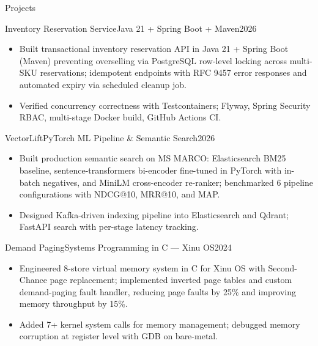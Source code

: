\documentclass[]{mcdowellcv}
\begin{document}
\begin{cvsection}{Projects}
  \begin{cvsubsection}{Inventory Reservation Service}{Java 21 + Spring Boot + Maven}{2026}
    \begin{itemize}
      \item Built transactional inventory reservation API in Java 21 + Spring Boot (Maven) preventing overselling via PostgreSQL row-level locking across multi-SKU reservations; idempotent endpoints with RFC 9457 error responses and automated expiry via scheduled cleanup job.
      \item Verified concurrency correctness with Testcontainers; Flyway, Spring Security RBAC, multi-stage Docker build, GitHub Actions CI.
    \end{itemize}
    \vspace{-1.5pt}
  \end{cvsubsection}

  \begin{cvsubsection}{VectorLift}{PyTorch ML Pipeline \& Semantic Search}{2026}
    \begin{itemize}
      \item Built production semantic search on MS MARCO: Elasticsearch BM25 baseline, sentence-transformers bi-encoder fine-tuned in PyTorch with in-batch negatives, and MiniLM cross-encoder re-ranker; benchmarked 6 pipeline configurations with NDCG@10, MRR@10, and MAP.
      \item Designed Kafka-driven indexing pipeline into Elasticsearch and Qdrant; FastAPI search with per-stage latency tracking.
    \end{itemize}
    \vspace{-1.5pt}
  \end{cvsubsection}

  \begin{cvsubsection}{Demand Paging}{Systems Programming in C --- Xinu OS}{2024}
    \begin{itemize}
      \item Engineered 8-store virtual memory system in C for Xinu OS with Second-Chance page replacement; implemented inverted page tables and custom demand-paging fault handler, reducing page faults by 25\% and improving memory throughput by 15\%.
      \item Added 7+ kernel system calls for memory management; debugged memory corruption at register level with GDB on bare-metal.
    \end{itemize}
  \end{cvsubsection}
\end{cvsection}
\end{document}
